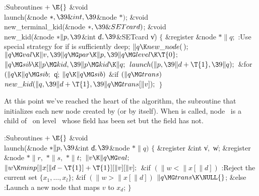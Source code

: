 \Y\B\4:Subroutines\X${}\mathrel+\E{}$\6
\&{void} \\{launch}(\&{node} ${}{*},\39\&{int},\39{}$\&{node} ${}{*}){}$;\6
\&{void} \\{new\_terminal\_kid}(\&{node} ${}{*},\39\&{SETcard}){}$;\7
\&{void} \\{new\_kid}(\&{node} ${}{*}\|p,\39{}$\&{int} \|d${},\39{}$\&{SETcard}
\|v)\1\1\2\2\6
${}\{{}$\1\6
\&{register} \&{node} ${}{*}\|q;{}$\7
:Use special strategy for  if  is sufficiently
deep\X;\6
${}\|q\K\\{new\_node}(\,);{}$\6
${}\|q\MG\\{val}\K\|v,\39\|q\MG\\{par}\K\|p,\39\|q\MG\\{level}\K\T{0};{}$\6
${}\|q\MG\\{sib}\K\|p\MG\\{kid},\39\|p\MG\\{kid}\K\|q;{}$\6
${}\\{launch}(\|p,\39\|d+\T{1},\39\|q);{}$\6
\&{for} ${}(\|q\K\|q\MG\\{sib};{}$ \|q; ${}\|q\K\|q\MG\\{sib}){}$\1\6
\&{if} ${}(\|q\MG\\{trans}){}$\1\5
${}\\{new\_kid}(\|q,\39\|d+\T{1},\39\|q\MG\\{trans}[\|v]);{}$\2\2\6
\4${}\}{}$\2\par
\fi

At this point we've reached the heart of the algorithm, the 
subroutine that initializes each new node created by  (or by
 itself). When  is called, node~%
 is a child of~
on level~ whose  field has been set but the 
field has not.

\Y\B\4:Subroutines\X${}\mathrel+\E{}$\6
\&{void} \\{launch}(\&{node} ${}{*}\|p,\39{}$\&{int} \|d${},\39{}$\&{node}
${}{*}\|q){}$\1\1\2\2\6
${}\{{}$\1\6
\&{register} \&{int} \|v${},{}$ \|w;\6
\&{register} \&{node} ${}{*}\|r,{}$ ${}{*}\|s,{}$ ${}{*}\|t;{}$\7
${}\|v\K\|q\MG\\{val};{}$\6
${}\|w\K\\{minp}[\|x[\|d-\T{1}]+\T{1}][\|v][\|v];{}$\6
\&{if} ${}(\|w<\|x[\|d]){}$\1\5
:Reject the current set $\{x_1,\ldots,x_l\}$\X;\2\6
\&{if} ${}(\|w>\|x[\|d]){}$\1\5
${}\|q\MG\\{trans}\K\NULL{}$;\2\6
\&{else}\1\5
:Launch a new node that maps $v$ to $x_d$\X;\2\6
\4${}\}{}$\2\par
\fi

